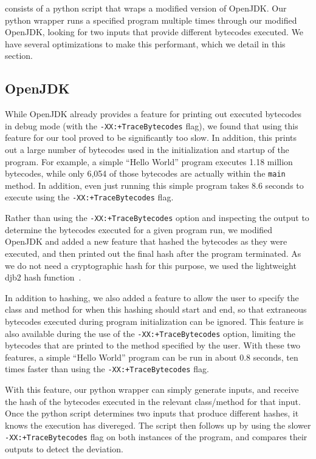 
\jcupid consists of a python script that wraps a modified version of OpenJDK.
Our python wrapper runs a specified program multiple times through our modified
OpenJDK, looking for two inputs that provide different bytecodes executed. We
have several optimizations to make this performant, which we detail in this
section.

\subsection{OpenJDK}
\label{sec:OpenJDK}

While OpenJDK already provides a feature for printing out executed bytecodes in
debug mode (with the \texttt{-XX:+TraceBytecodes} flag), we found that using
this feature for our tool proved to be significantly too slow. In addition,
this prints out a large number of bytecodes used in the initialization and
startup of the program. For example, a simple ``Hello World'' program executes
1.18 million bytecodes, while only 6,054 of those bytecodes are actually within
the \texttt{main} method. In addition, even just running this simple program
takes 8.6 seconds to execute using the \texttt{-XX:+TraceBytecodes} flag.

Rather than using the \texttt{-XX:+TraceBytecodes} option and inspecting the
output to determine the bytecodes executed for a given program run, we modified
OpenJDK and added a new feature that hashed the bytecodes as they were executed,
and then printed out the final hash after the program terminated. As we do not
need a cryptographic hash for this purpose, we used the lightweight djb2 hash
function~\cite{djb2Hash}.

In addition to hashing, we also added a feature to allow the user
to specify the class and method for when this hashing should start and end, so
that extraneous bytecodes executed during program initialization can be ignored.
This feature is also available during the use of the
\texttt{-XX:+TraceBytecodes} option, limiting the bytecodes that are printed to
the method specified by the user. With these two features, a simple ``Hello
World'' program can be run in about 0.8 seconds, ten times faster than using
the \texttt{-XX:+TraceBytecodes} flag.

With this feature, our python wrapper can simply generate inputs, and receive
the hash of the bytecodes executed in the relevant class/method for that input.
Once the python script determines two inputs that produce different hashes, it
knows the execution has divereged. The script then follows up by using the
slower \texttt{-XX:+TraceBytecodes} flag on both instances of the program, and
compares their outputs to detect the deviation. 

